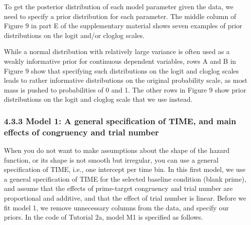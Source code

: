 \documentclass[
  man,floatsintext]{apa6}
\begin{document}
To get the posterior distribution of each model parameter given the data, we need to specify a prior distribution for each parameter. The middle column of Figure 9 in part E of the supplementary material shows seven examples of prior distributions on the logit and/or cloglog scales.

While a normal distribution with relatively large variance is often used as a weakly informative prior for continuous dependent variables, rows A and B in Figure 9 show that specifying such distributions on the logit and cloglog scales leads to rather informative distributions on the original probability scale, as most mass is pushed to probabilities of 0 and 1. The other rows in Figure 9 show prior distributions on the logit and cloglog scale that we use instead.

\subsubsection{4.3.3 Model 1: A general specification of TIME, and main effects of congruency and trial number}\label{model-1-a-general-specification-of-time-and-main-effects-of-congruency-and-trial-number}

When you do not want to make assumptions about the shape of the hazard function, or its shape is not smooth but irregular, you can use a general specification of TIME, i.e., one intercept per time bin. In this first model, we use a general specification of TIME for the selected baseline condition (blank prime), and assume that the effects of prime-target congruency and trial number are proportional and additive, and that the effect of trial number is linear.
Before we fit model 1, we remove unnecessary columns from the data, and specify our priors. In the code of Tutorial 2a, model M1 is specified as follows.

\scriptsize
\end{document}
